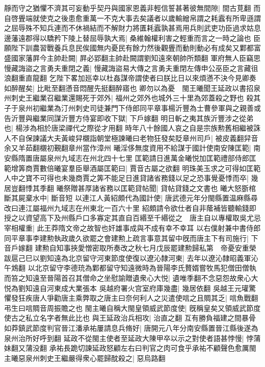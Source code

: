 靜而守之猶懼不濟其可妄動乎契丹與國家恩義非輕信誓甚著彼無間隙|{
	間古莧翻}
而自啓舋端就使克之後患愈重萬一不克大事去矣議者以歲輸繒帛謂之耗蠧有所卑遜謂之屈辱殊不知兵連而不休禍結而不解財力將匱耗蠧孰甚焉用兵則武吏功臣過求姑息邊藩遠郡得以驕矜下陵上替屈辱孰大焉|{
	桑維翰權利害之輕重而言之一時之論也}
臣願陛下訓農習戰養兵息民俟國無内憂民有餘力然後觀舋而動則動必有成矣又鄴都富盛國家藩屛今主帥赴闕|{
	屛必郢翻主帥赴闕謂劉知遠來朝帥所類翻}
軍府無人臣竊思慢藏誨盜之言勇夫重閉之義|{
	慢藏誨盜易大傳之言勇夫重閉左傳申公巫臣之言藏徂浪翻重直龍翻}
乞陛下畧加廵幸以杜姦謀帝謂使者曰朕比日以來煩懣不決今見卿奏如醉醒矣|{
	比毗至翻懣音悶醒先挺翻醉寤也}
卿勿以為憂　閩王曦聞王延政以書招泉州刺史王繼業召繼業還賜死于郊外|{
	福州之郊外也城外三十里為郊蓋殺之野也}
殺其子于泉州初繼業為汀州刺史司徒兼門下侍郎同平章事楊沂豐為士曹參軍與之親善或告沂豐與繼業同謀沂豐方侍宴即收下獄|{
	下戶嫁翻}
明日斬之夷其族沂豐涉之從弟也|{
	楊涉為相於唐梁禪代之際從才用翻}
時年八十餘國人哀之自是宗族勲舊相繼被誅人不自保諫議大夫黃峻舁櫬詣朝堂極諫曦曰老物狂發矣貶章州司戶|{
	被皮義翻舁音余又羊茹翻櫬初覲翻章州當作漳州}
曦淫侈無度資用不給謀于國計使南安陳匡範|{
	南安縣隋置唐屬泉州九域志在州北四十七里}
匡範請日進萬金曦悦加匡範禮部侍郎匡範增筭商賈數倍曦宴羣臣舉酒屬匡範曰|{
	賈音古屬之欲翻}
明珠美玉求之可得如匡範人中之寶不可得也未幾商賈之筭不能足日進貸諸省務錢以足之恐事覺憂悸而卒|{
	幾居豈翻悸其季翻}
曦祭贈甚厚諸省務以匡範貸帖聞|{
	貸帖貸錢之文書也}
曦大怒斵棺斷其屍棄水中|{
	斷音短}
以連江人黃紹頗代為國計使|{
	唐武德元年分閩縣置温麻縣尋改曰連江屬福州九域志在州東北一百六十里}
紹頗請令欲仕者自非䕃補皆聽輸錢即授之以資望高下及州縣戶口多寡定其直自百緡至千緡從之　唐主自以專權取吳尤忌宰相權重|{
	此王莽隋文帝之故智也奸雄事成與不成有幸不幸耳}
以右僕射兼中書侍郎同平章事李建勲執政歲久欲罷之會建勲上疏言事意其留中旣而唐主下有司施行|{
	下音戶嫁翻}
建勲自知事挾愛憎密取所奏改之秋七月戊辰罷建勲歸私第　帝憂安重榮跋扈己巳以劉知遠為北京留守河東節度使復以遼沁隸河東|{
	去年以遼沁隸昭義軍沁午鴆翻}
以北京留守李德珫為鄴都留守知遠微時為晉陽李氏贅婿嘗牧馬犯僧田僧執而笞之知遠至晉陽首召其僧命之坐慰諭贈遺衆心大悦|{
	遺唯季翻不念惡怨故衆心大悦為劉知遠自河東成大業張本}
吳越府署火宫室府庫幾盡|{
	幾居依翻}
吳越王元瓘驚懼發狂疾唐人爭勸唐主乘弊取之唐主曰奈何利人之災遣使唁之且賙其乏|{
	唁魚戰翻弔生曰唁賙音周振贍之也}
閩主曦自稱大閩皇領威武節度使|{
	旣稱皇矣又領威武節度使古之私立名字者無此比也}
與王延政治兵相攻|{
	治直之翻}
互有勝負福建之間暴骨如莽鎮武節度判官晉江潘承祐屢請息兵脩好|{
	唐開元八年分南安縣置晉江縣後遂為泉州治所好呼到翻}
延政不從閩主使者至延政大陳甲卒以示之對使者語甚悖慢|{
	悖蒲妹翻又蒲没翻}
承祐長跪切諫延政怒顧左右曰判官之肉可食乎承祐不顧聲色愈厲閩主曦惡泉州刺史王繼嚴得衆心罷歸酖殺之|{
	惡烏路翻}
